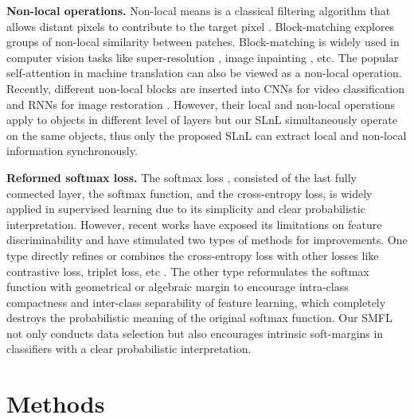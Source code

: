 \documentclass{article}
\begin{document}
\textbf{Non-local operations.}
Non-local means is a classical filtering algorithm that allows distant pixels to contribute to the target pixel \cite{DBLP:conf/cvpr/BuadesCM05}. Block-matching \cite{DBLP:journals/tip/DabovFKE07} explores groups of non-local similarity between patches. Block-matching is widely used in computer vision tasks like super-resolution \cite{DBLP:conf/iccv/GlasnerBI09}, image inpainting \cite{DBLP:journals/tog/BarnesSFG09}, etc. The popular self-attention \cite{DBLP:conf/nips/VaswaniSPUJGKP17} in machine translation can also be viewed as a non-local operation. Recently, different non-local blocks are inserted into CNNs for video classification \cite{DBLP:journals/corr/abs-1711-07971} and RNNs for image restoration \cite{DBLP:journals/corr/abs-1806-02919}. However, their local and non-local operations apply to objects in different level of layers but our SLnL simultaneously operate on the same objects, thus only the proposed SLnL can extract local and non-local information synchronously.

\textbf{Reformed softmax loss.}
The softmax loss \cite{DBLP:conf/icml/LiuWYY16}, consisted of the last fully connected layer, the softmax function, and the cross-entropy loss, is widely applied in supervised learning due to its simplicity and clear probabilistic interpretation. However, recent works \cite{DBLP:conf/icml/LiuWYY16,DBLP:conf/ijcai/WangZLLGL18} have exposed its limitations on feature discriminability and have stimulated two types of methods for improvements. One type directly refines or combines the cross-entropy loss with other losses like contrastive loss, triplet loss, etc \cite{DBLP:conf/ijcai/WangZLLGL18,DBLP:conf/cvpr/SchroffKP15}. The other type reformulates the softmax function with geometrical or algebraic margin \cite{DBLP:conf/icml/LiuWYY16,DBLP:conf/ijcai/WangZLLGL18} to encourage intra-class compactness and inter-class separability of feature learning, which completely destroys the probabilistic meaning of the original softmax function. Our SMFL not only conducts data selection but also encourages intrinsic soft-margins in classifiers with a clear probabilistic interpretation.

\section{Methods}
\end{document}
